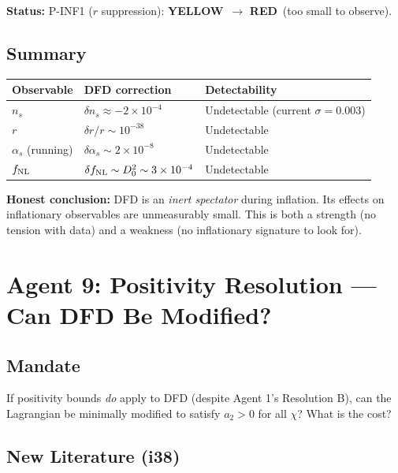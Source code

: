 \documentclass[11pt,a4paper]{article}
\newcommand{\YELLOW}{\textcolor{dfdyellow}{\textbf{YELLOW}}}
\newcommand{\RED}{\textcolor{dfdred}{\textbf{RED}}}
\begin{document}
\textbf{Status:} P-INF1 ($r$ suppression): \YELLOW\ $\to$ \RED\ (too small to observe).

\subsection{Summary}

\begin{center}
\begin{tabular}{lll}
\toprule
\textbf{Observable} & \textbf{DFD correction} & \textbf{Detectability} \\
\midrule
$n_s$ & $\delta n_s \approx -2 \times 10^{-4}$ & Undetectable (current $\sigma = 0.003$) \\
$r$ & $\delta r/r \sim 10^{-38}$ & Undetectable \\
$\alpha_s$ (running) & $\delta\alpha_s \sim 2 \times 10^{-8}$ & Undetectable \\
$f_{\rm NL}$ & $\delta f_{\rm NL} \sim D_0^2 \sim 3 \times 10^{-4}$ & Undetectable \\
\bottomrule
\end{tabular}
\end{center}

\textbf{Honest conclusion:} DFD is an \emph{inert spectator} during inflation. Its effects on inflationary observables are unmeasurably small. This is both a strength (no tension with data) and a weakness (no inflationary signature to look for).


\newpage
\section{Agent 9: Positivity Resolution --- Can DFD Be Modified?}
\label{sec:agent9}

\subsection{Mandate}

If positivity bounds \emph{do} apply to DFD (despite Agent 1's Resolution B), can the Lagrangian be minimally modified to satisfy $a_2 > 0$ for all $\chi$? What is the cost?

\subsection{New Literature (i38)}
\end{document}
